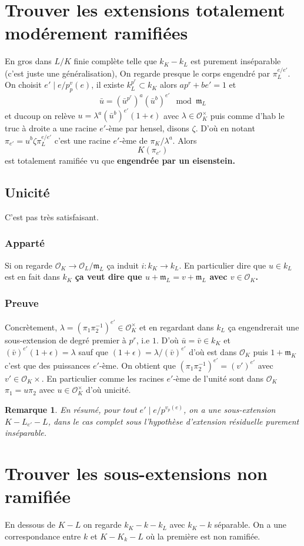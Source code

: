 \documentclass[a4paper,12pt]{book}
\newcommand{\Or}{\mathcal{O}}
\newcommand{\m}{\mathfrak m}
\theoremstyle{plain}
\newtheorem{rem}{Remarque}
\theoremstyle{definition}
\theoremstyle{remark}
\begin{document}
\section{Trouver les extensions totalement modérement ramifiées}
En gros dans $L/K$ finie complète telle que $k_K-k_L$
est purement inséparable (c'est juste une généralisation), 
On regarde presque le corps engendré par $\pi_L^{e/e'}$.
On choisit $e'\mid e/p^v_p(e)$, il existe $k_L^{p^r}\subset k_K$
alors $ap^r+be'=1$ et
\[\bar u=(\bar u^{p^r})^a(\bar u^b)^{e'}\mod \m_L\]
et ducoup on relève $u=\lambda^a(\bar u^b)^{e'}(1+\epsilon)$
avec $\lambda\in \Or_K^\times $ puis comme d'hab le truc à droite
a une racine $e'$-ème par hensel, disons $\zeta$. D'où en notant
$\pi_{e'}=u^b\zeta\pi_L^{e/e'}$ c'est une racine $e'$-ème de 
$\pi_K/\lambda^a$. Alors
\[K(\pi_{e'})\]
est totalement ramifiée vu que 
\textbf{engendrée par un eisenstein.}

\subsection{Unicité}
C'est pas très satisfaisant.
\subsubsection{Apparté}
Si on regarde $\Or_K\to\Or_L/\m_L$ ça induit $i\colon k_K\to k_L$.
En particulier dire que $u\in k_L$ est en fait dans $k_K$ 
\textbf{ça veut dire que $u+\m_L=v+\m_L$ avec $v\in \Or_K$.}
\subsubsection{Preuve}
Concrètement, $\lambda=(\pi_1\pi_2^{-1})^{e'}\in \Or_K^\times$ et
en regardant dans $k_L$ ça engendrerait une sous-extension de 
degré premier à $p^r$, i.e $1$. D'où $\bar u=\bar v\in k_K$ et
$(\bar v)^{e'}(1+\epsilon)=\lambda$ sauf que 
$(1+\epsilon)=\lambda/(\bar v)^{e'}$ d'où est dans $\Or_K$ puis
$1+\m_K$ c'est que des puissances $e'$-ème. On obtient que
$(\pi_1\pi_2^{-1})^{e'}=(v')^{e'}$ avec $v'\in \Or_K\times$.
En particulier comme les racines $e'$-ème de l'unité sont dans
$\Or_K$ $\pi_1=u\pi_2$ avec $u\in\Or_K^\times$ d'où unicité.


\begin{rem}
    En résumé, pour tout $e'\mid e/p^{v_p(e)}$, on a une 
    sous-extension $K-L_{e'}-L$, dans le cas complet sous
    l'hypothèse d'extension résiduelle purement inséparable.
\end{rem}
\section{Trouver les sous-extensions non ramifiée}
En dessous de $K-L$ on regarde $k_K-k-k_L$ avec $k_K-k$ séparable.
On a une correspondance entre $k$ et $K-K_k-L$ où la première est
non ramifiée.
\end{document}
